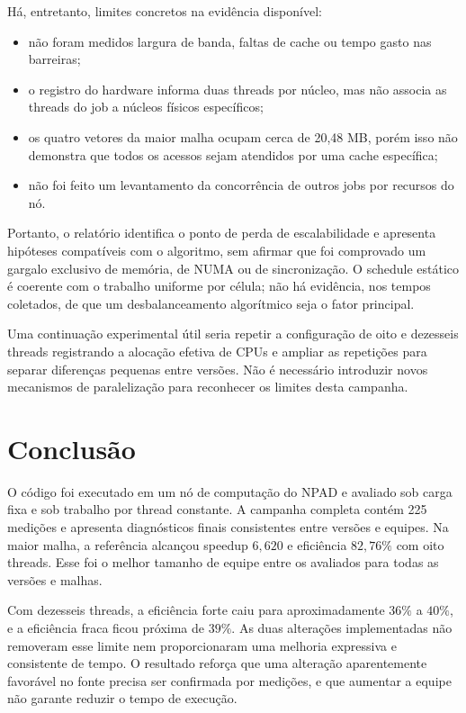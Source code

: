 \documentclass[12pt,a4paper]{article}
\begin{document}
Há, entretanto, limites concretos na evidência disponível:
\begin{itemize}
\item não foram medidos largura de banda, faltas de cache ou tempo gasto nas barreiras;
\item o registro do hardware informa duas threads por núcleo, mas não associa as threads do job a núcleos físicos específicos;
\item os quatro vetores da maior malha ocupam cerca de 20,48 MB, porém isso não demonstra que todos os acessos sejam atendidos por uma cache específica;
\item não foi feito um levantamento da concorrência de outros jobs por recursos do nó.
\end{itemize}
Portanto, o relatório identifica o ponto de perda de escalabilidade e apresenta hipóteses compatíveis com o algoritmo, sem afirmar que foi comprovado um gargalo exclusivo de memória, de NUMA ou de sincronização. O schedule estático é coerente com o trabalho uniforme por célula; não há evidência, nos tempos coletados, de que um desbalanceamento algorítmico seja o fator principal.

Uma continuação experimental útil seria repetir a configuração de oito e dezesseis threads registrando a alocação efetiva de CPUs e ampliar as repetições para separar diferenças pequenas entre versões. Não é necessário introduzir novos mecanismos de paralelização para reconhecer os limites desta campanha.

\section{Conclusão}
O código foi executado em um nó de computação do NPAD e avaliado sob carga fixa e sob trabalho por thread constante. A campanha completa contém 225 medições e apresenta diagnósticos finais consistentes entre versões e equipes. Na maior malha, a referência alcançou speedup $6{,}620$ e eficiência $82{,}76\%$ com oito threads. Esse foi o melhor tamanho de equipe entre os avaliados para todas as versões e malhas.

Com dezesseis threads, a eficiência forte caiu para aproximadamente $36\%$ a $40\%$, e a eficiência fraca ficou próxima de $39\%$. As duas alterações implementadas não removeram esse limite nem proporcionaram uma melhoria expressiva e consistente de tempo. O resultado reforça que uma alteração aparentemente favorável no fonte precisa ser confirmada por medições, e que aumentar a equipe não garante reduzir o tempo de execução.
\end{document}
